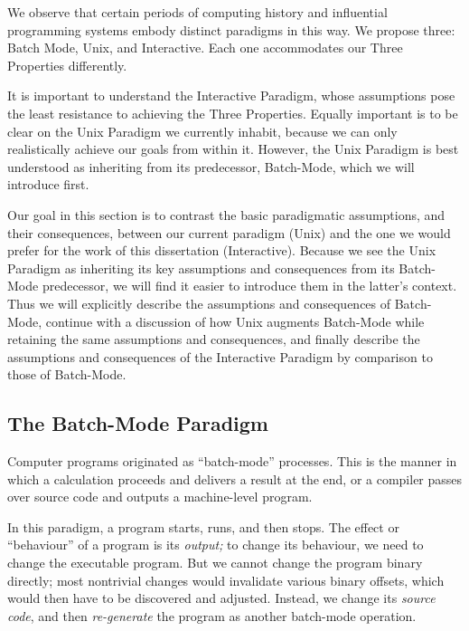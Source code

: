 \documentclass[ twoside,openright,titlepage,numbers=noenddot,headinclude,footinclude,cleardoublepage=empty,abstract=on,
                BCOR=5mm,paper=a4,fontsize=11pt
                ]{scrreprt}
\newcommand{\joel}[1]{}
\theoremstyle{definition}
\begin{document}
We observe that certain periods of computing history and influential
programming systems embody distinct paradigms in this way. We propose
three: Batch Mode, Unix, and Interactive. Each one accommodates our
Three Properties differently.

It is important to understand the Interactive Paradigm, whose
assumptions pose the least resistance to achieving the Three Properties.
Equally important is to be clear on the Unix Paradigm we currently
inhabit, because we can only realistically achieve our goals from within
it. However, the Unix Paradigm is best understood as inheriting from its
predecessor, Batch-Mode, which we will introduce first.

Our goal in this section is to contrast the basic paradigmatic
assumptions, and their consequences, between our current paradigm (Unix)
and the one we would prefer for the work of this dissertation
(Interactive). Because we see the Unix Paradigm as inheriting its key
assumptions and consequences from its Batch-Mode predecessor, we will
find it easier to introduce them in the latter's context. Thus we will
explicitly describe the assumptions and consequences of Batch-Mode,
continue with a discussion of how Unix augments Batch-Mode while
retaining the same assumptions and consequences, and finally describe
the assumptions and consequences of the Interactive Paradigm by
comparison to those of Batch-Mode.

\joel{
- run time: the time at which a program runs
- runtime: the software that supports the execution of a program
- run-time: the adjective describing when something happens
}

\hypertarget{the-batch-mode-paradigm}{\subsection{The Batch-Mode Paradigm}\label{the-batch-mode-paradigm}}

Computer programs originated as ``batch-mode'' processes. This is the
manner in which a calculation proceeds and delivers a result at the end,
or a compiler passes over source code and outputs a machine-level
program.

In this paradigm, a program starts, runs, and then stops. The effect or
``behaviour'' of a program is its \emph{output;} to change its
behaviour, we need to change the executable program. But we cannot
change the program binary directly; most nontrivial changes would
invalidate various binary offsets, which would then have to be
discovered and adjusted. Instead, we change its \emph{source code}, and
then \emph{re-generate} the program as another batch-mode operation.
\end{document}
